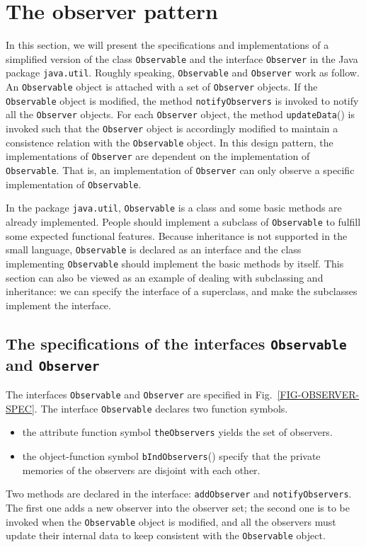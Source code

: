 \documentclass[fleqn]{llncs}
\begin{document}
\section{The observer pattern}
In this section, we will present the specifications and implementations of a simplified version of the class \texttt{Observable} and the interface \texttt{Observer}
in the Java package \texttt{java.util}. Roughly speaking, \texttt{Observable} and \texttt{Observer} work as follow.
An \texttt{Observable} object is attached with a set of \texttt{Observer} objects. If the \texttt{Observable} object is modified,
the method \texttt{notifyObservers} is invoked to notify all the \texttt{Observer} objects. For each \texttt{Observer} object, the method \texttt{updateData}() is invoked
such that the \texttt{Observer} object is accordingly modified to maintain a consistence relation with the \texttt{Observable} object.
In this design pattern, the implementations of \texttt{Observer} are dependent on the implementation of \texttt{Observable}. That is,
an implementation of \texttt{Observer} can only observe a specific implementation of \texttt{Observable}.

In the package \texttt{java.util}, \texttt{Observable} is a class and some basic methods are already implemented.
People should implement a subclass of \texttt{Observable} to fulfill some expected functional features.
Because inheritance is not supported in the small language, \texttt{Observable} is declared as an interface and the class implementing \texttt{Observable}
should implement the basic methods by itself.
This section can also be viewed as an example of dealing with subclassing and inheritance: we can
specify the interface of a superclass, and make the subclasses implement the interface.

\subsection{The specifications  of the interfaces \texttt{Observable} and \texttt{Observer}}
The interfaces \texttt{Observable} and \texttt{Observer} are specified in Fig.~\ref{FIG-OBSERVER-SPEC}.
The interface \texttt{Observable} declares two function symbols.
\begin{itemize}
\item the attribute function symbol \texttt{theObservers} yields the set of observers.
\item the object-function symbol \texttt{bIndObservers}() specify that the private memories of the observers are disjoint with each other.
\end{itemize}
Two methods are declared in the interface: \texttt{addObserver} and \texttt{notifyObservers}. The first one adds a new observer into
the observer set; the second one is to be invoked when the \texttt{Observable} object is modified, and all the observers must update their
internal data to keep consistent with the \texttt{Observable} object.
\end{document}
